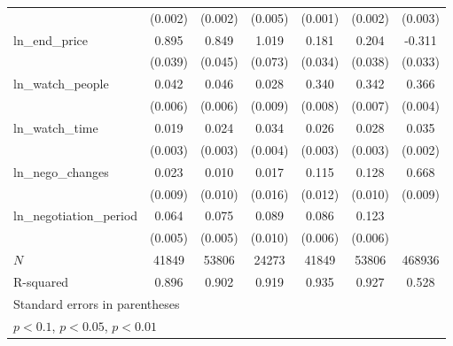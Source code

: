 {\begin{tabular}{l*{6}{c}}
            &     (0.002)         &     (0.002)         &     (0.005)         &     (0.001)         &     (0.002)         &     (0.003)         \\
\addlinespace
ln\_end\_price&       0.895\sym{***}&       0.849\sym{***}&       1.019\sym{***}&       0.181\sym{***}&       0.204\sym{***}&      -0.311\sym{***}\\
            &     (0.039)         &     (0.045)         &     (0.073)         &     (0.034)         &     (0.038)         &     (0.033)         \\
\addlinespace
ln\_watch\_people&       0.042\sym{***}&       0.046\sym{***}&       0.028\sym{***}&       0.340\sym{***}&       0.342\sym{***}&       0.366\sym{***}\\
            &     (0.006)         &     (0.006)         &     (0.009)         &     (0.008)         &     (0.007)         &     (0.004)         \\
\addlinespace
ln\_watch\_time&       0.019\sym{***}&       0.024\sym{***}&       0.034\sym{***}&       0.026\sym{***}&       0.028\sym{***}&       0.035\sym{***}\\
            &     (0.003)         &     (0.003)         &     (0.004)         &     (0.003)         &     (0.003)         &     (0.002)         \\
\addlinespace
ln\_nego\_changes&       0.023\sym{***}&       0.010         &       0.017         &       0.115\sym{***}&       0.128\sym{***}&       0.668\sym{***}\\
            &     (0.009)         &     (0.010)         &     (0.016)         &     (0.012)         &     (0.010)         &     (0.009)         \\
\addlinespace
ln\_negotiation\_period&       0.064\sym{***}&       0.075\sym{***}&       0.089\sym{***}&       0.086\sym{***}&       0.123\sym{***}&                     \\
            &     (0.005)         &     (0.005)         &     (0.010)         &     (0.006)         &     (0.006)         &                     \\
\midrule
\(N\)       &       41849         &       53806         &       24273         &       41849         &       53806         &      468936         \\
R-squared   &       0.896         &       0.902         &       0.919         &       0.935         &       0.927         &       0.528         \\
\bottomrule
\multicolumn{7}{l}{\footnotesize Standard errors in parentheses}\\
\multicolumn{7}{l}{\footnotesize \sym{*} \(p<0.1\), \sym{**} \(p<0.05\), \sym{***} \(p<0.01\)}\\
\end{tabular}
}
